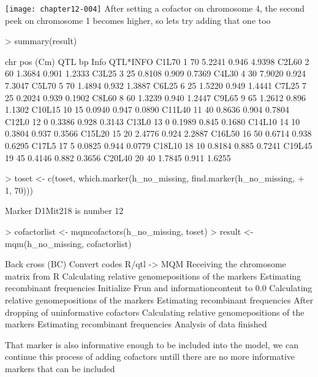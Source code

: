 \documentclass[a4paper]{article}
\begin{document}
\texttt{[image: chapter12-004]}
After setting a cofactor on chromosome 4, the second peek on chromosome 1 becomes higher, so lets try adding that one too
\begin{Schunk}
\begin{Sinput}
> summary(result)
\end{Sinput}
\begin{Soutput}
       chr pos (Cm) QTL bp  Info QTL*INFO
C1L70    1       70 5.2241 0.946   4.9398
C2L60    2       60 1.3684 0.901   1.2333
C3L25    3       25 0.8108 0.909   0.7369
C4L30    4       30 7.9020 0.924   7.3047
C5L70    5       70 1.4894 0.932   1.3887
C6L25    6       25 1.5220 0.949   1.4441
C7L25    7       25 0.2024 0.939   0.1902
C8L60    8       60 1.3239 0.940   1.2447
C9L65    9       65 1.2612 0.896   1.1302
C10L15  10       15 0.0940 0.947   0.0890
C11L40  11       40 0.8636 0.904   0.7804
C12L0   12        0 0.3386 0.928   0.3143
C13L0   13        0 0.1989 0.845   0.1680
C14L10  14       10 0.3804 0.937   0.3566
C15L20  15       20 2.4776 0.924   2.2887
C16L50  16       50 0.6714 0.938   0.6295
C17L5   17        5 0.0825 0.944   0.0779
C18L10  18       10 0.8184 0.885   0.7241
C19L45  19       45 0.4146 0.882   0.3656
C20L40  20       40 1.7845 0.911   1.6255
\end{Soutput}
\begin{Sinput}
> toset <- c(toset, which.marker(h_no_missing, find.marker(h_no_missing, 
+     1, 70)))
\end{Sinput}
\begin{Soutput}
Marker D1Mit218 is number 12 
\end{Soutput}
\begin{Sinput}
> cofactorlist <- mqmcofactors(h_no_missing, toset)
> result <- mqm(h_no_missing, cofactorlist)
\end{Sinput}
\begin{Soutput}
Back cross (BC)
Convert codes R/qtl -> MQM
Receiving the chromosome matrix from R
Calculating relative genomepositions of the markers
Estimating recombinant frequencies
Initialize Frun and informationcontent to 0.0
Calculating relative genomepositions of the markers
Estimating recombinant frequencies
After dropping of uninformative cofactors
Calculating relative genomepositions of the markers
Estimating recombinant frequencies
Analysis of data finished
\end{Soutput}
\end{Schunk}
That marker is also informative enough to be included into the model, we can continue this process of adding
cofactors untill there are no more informative markers that can be included
\end{document}
